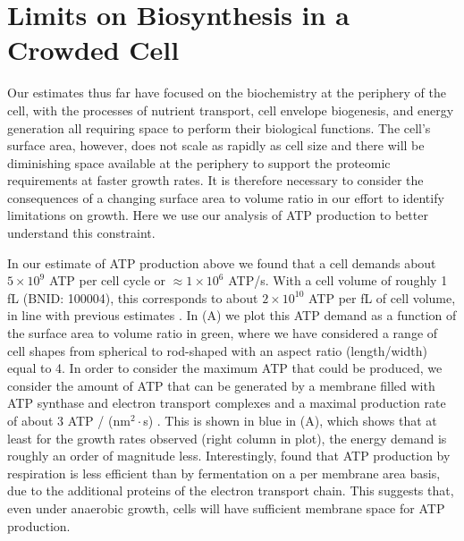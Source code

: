\section{Limits on Biosynthesis in a Crowded Cell}
Our estimates thus far have focused on the biochemistry at the periphery of the
cell, with the processes of nutrient transport, cell envelope biogenesis, and
energy generation all requiring space to perform their biological functions. The
cell's surface area, however, does not scale as rapidly as cell size
\citep{harris2018} and there will be diminishing space available at the
periphery to support the proteomic requirements at faster growth rates. It is
therefore necessary to consider the consequences of a changing surface area to
volume ratio in our effort to identify limitations on growth. Here we use our
analysis of ATP production to better understand this constraint.

In our estimate of ATP production above we found that a cell demands about $5
\times 10^9$ ATP per cell cycle or $\approx 1 \times 10^6$ ATP/s. With a cell
volume of roughly 1 fL (BNID: 100004), this corresponds to about $2 \times
10^{10}$ ATP per fL of cell volume, in line with previous estimates
\citep{stouthamer1977, szenk2017}. In (A) we plot this ATP
demand as a function of the surface area to volume ratio in green, where we have
considered a range of cell shapes from spherical to rod-shaped with an aspect
ratio (length/width) equal to 4. In order to consider the maximum ATP that could
be produced, we consider the amount of ATP that can be generated by a membrane
filled with ATP synthase and electron transport complexes and a maximal
production rate of about 3 ATP / (nm$^2 \cdot$s) \citep{szenk2017}. This is
shown in blue in (A), which shows that at least for the
growth rates observed (right column in plot), the energy demand is roughly an
order of magnitude less. Interestingly, \cite{szenk2017} found that ATP
production by respiration is less efficient than by fermentation on a per
membrane area basis, due to the additional proteins of the electron transport
chain. This suggests that, even under anaerobic growth, cells will have
sufficient membrane space for ATP production.


